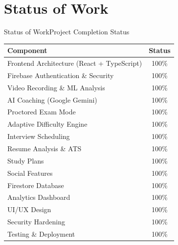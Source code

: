 \documentclass{beamer}
\begin{document}
\section{Status of Work}
\begin{frame}{Status of Work}{Project Completion Status}
\begin{table}
\centering
\scriptsize
\begin{tabular}{|p{5cm}|c|}
\hline
\textbf{Component} & \textbf{Status} \\ \hline
Frontend Architecture (React + TypeScript) & 100\% \\ \hline
Firebase Authentication \& Security & 100\% \\ \hline
Video Recording \& ML Analysis & 100\% \\ \hline
AI Coaching (Google Gemini) & 100\% \\ \hline
Proctored Exam Mode & 100\% \\ \hline
Adaptive Difficulty Engine & 100\% \\ \hline
Interview Scheduling & 100\% \\ \hline
Resume Analysis \& ATS & 100\% \\ \hline
Study Plans & 100\% \\ \hline
Social Features & 100\% \\ \hline
Firestore Database & 100\% \\ \hline
Analytics Dashboard & 100\% \\ \hline
UI/UX Design & 100\% \\ \hline
Security Hardening & 100\% \\ \hline
Testing \& Deployment & 100\% \\ \hline
\end{tabular}
\end{table}
\end{frame}

\end{document}
